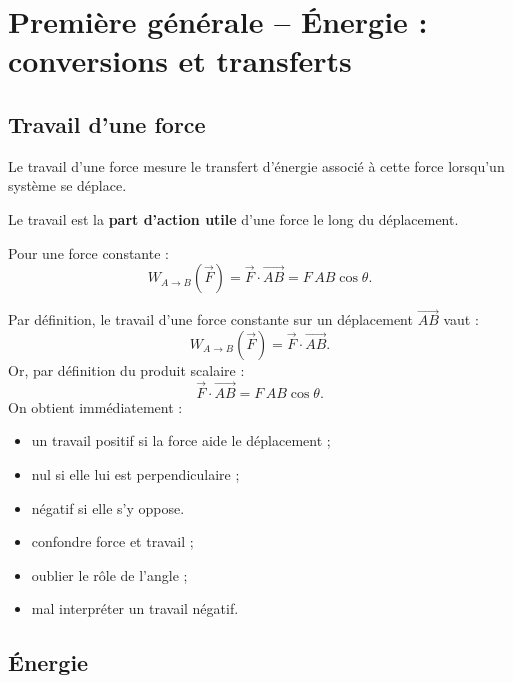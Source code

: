 \documentclass[11pt,a4paper]{article}
\begin{document}
\newpage

\section{Première générale -- Énergie : conversions et transferts}

\subsection{Travail d'une force}

\begin{sens}
Le travail d'une force mesure le transfert d'énergie associé à cette force
lorsqu'un système se déplace.
\end{sens}

\begin{imagem}
Le travail est la \textbf{part d'action utile} d'une force le long du déplacement.
\end{imagem}

\begin{bilan}
Pour une force constante :
\[
W_{A\to B}(\vec F)=\vec F\cdot \overrightarrow{AB}=F\,AB\cos\theta.
\]
\end{bilan}

\begin{demo}
Par définition, le travail d'une force constante sur un déplacement \(\overrightarrow{AB}\) vaut :
\[
W_{A\to B}(\vec F)=\vec F\cdot \overrightarrow{AB}.
\]
Or, par définition du produit scalaire :
\[
\vec F\cdot \overrightarrow{AB}=F\,AB\cos\theta.
\]
On obtient immédiatement :
\begin{itemize}
    \item un travail positif si la force aide le déplacement ;
    \item nul si elle lui est perpendiculaire ;
    \item négatif si elle s'y oppose.
\end{itemize}
\end{demo}

\begin{erreurs}
\begin{itemize}
    \item confondre force et travail ;
    \item oublier le rôle de l'angle ;
    \item mal interpréter un travail négatif.
\end{itemize}
\end{erreurs}

\subsection{Énergie}
\end{document}
